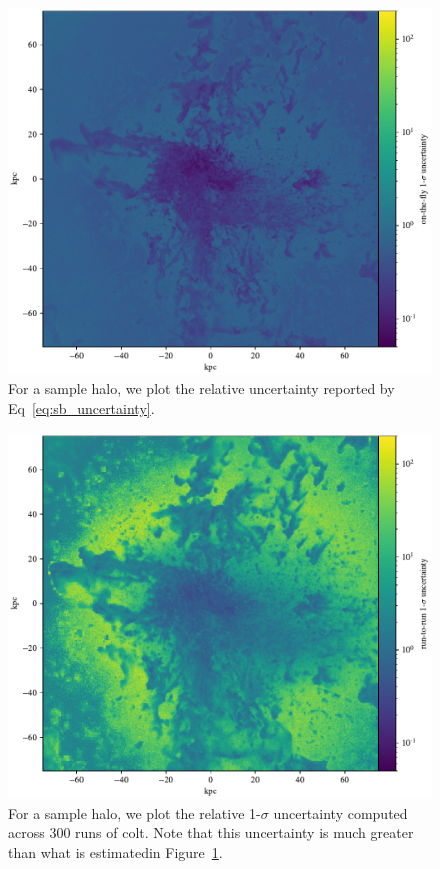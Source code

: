 \begin{figure}
    \centering
    \includegraphics[width=\textwidth,keepaspectratio]{figures/on_the_fly.pdf}
    \caption{
        For a sample halo, we plot the relative uncertainty reported by Eq~\ref{eq:sb_uncertainty}.
    }
  \label{fig:on_the_fly}
\end{figure}

\begin{figure}
    \centering
    \includegraphics[width=\textwidth,keepaspectratio]{figures/run_to_run.pdf}
    \caption{
        For a sample halo, we plot the relative 1-$\sigma$ uncertainty computed across 300 runs of {\sc colt}.
        Note that this uncertainty is much greater than what is estimatedin Figure~\ref{fig:on_the_fly}.
    }
  \label{fig:run_to_run}
\end{figure}



